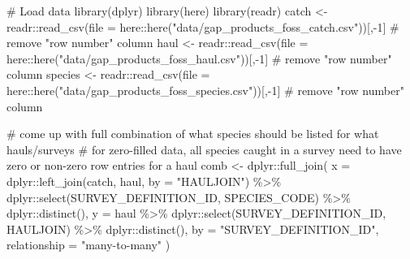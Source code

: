 \documentclass[
  letterpaper,
  oneside,
  open=any]{scrbook}
\newenvironment{Shaded}{\begin{snugshade}}{\end{snugshade}}
\newcommand{\AttributeTok}[1]{\textcolor[rgb]{0.40,0.45,0.13}{#1}}
\newcommand{\CommentTok}[1]{\textcolor[rgb]{0.37,0.37,0.37}{#1}}
\newcommand{\DecValTok}[1]{\textcolor[rgb]{0.68,0.00,0.00}{#1}}
\newcommand{\FunctionTok}[1]{\textcolor[rgb]{0.28,0.35,0.67}{#1}}
\newcommand{\NormalTok}[1]{\textcolor[rgb]{0.00,0.23,0.31}{#1}}
\newcommand{\OtherTok}[1]{\textcolor[rgb]{0.00,0.23,0.31}{#1}}
\newcommand{\SpecialCharTok}[1]{\textcolor[rgb]{0.37,0.37,0.37}{#1}}
\newcommand{\StringTok}[1]{\textcolor[rgb]{0.13,0.47,0.30}{#1}}
\begin{document}
\begin{Shaded}
\begin{Highlighting}[]
\CommentTok{\# Load data}
\FunctionTok{library}\NormalTok{(dplyr)}
\FunctionTok{library}\NormalTok{(here)}
\FunctionTok{library}\NormalTok{(readr)}
\NormalTok{catch }\OtherTok{\textless{}{-}}\NormalTok{ readr}\SpecialCharTok{::}\FunctionTok{read\_csv}\NormalTok{(}\AttributeTok{file =}\NormalTok{ here}\SpecialCharTok{::}\FunctionTok{here}\NormalTok{(}\StringTok{"data/gap\_products\_foss\_catch.csv"}\NormalTok{))[,}\SpecialCharTok{{-}}\DecValTok{1}\NormalTok{] }\CommentTok{\# remove "row number" column}
\NormalTok{haul }\OtherTok{\textless{}{-}}\NormalTok{ readr}\SpecialCharTok{::}\FunctionTok{read\_csv}\NormalTok{(}\AttributeTok{file =}\NormalTok{ here}\SpecialCharTok{::}\FunctionTok{here}\NormalTok{(}\StringTok{"data/gap\_products\_foss\_haul.csv"}\NormalTok{))[,}\SpecialCharTok{{-}}\DecValTok{1}\NormalTok{] }\CommentTok{\# remove "row number" column}
\NormalTok{species }\OtherTok{\textless{}{-}}\NormalTok{ readr}\SpecialCharTok{::}\FunctionTok{read\_csv}\NormalTok{(}\AttributeTok{file =}\NormalTok{ here}\SpecialCharTok{::}\FunctionTok{here}\NormalTok{(}\StringTok{"data/gap\_products\_foss\_species.csv"}\NormalTok{))[,}\SpecialCharTok{{-}}\DecValTok{1}\NormalTok{] }\CommentTok{\# remove "row number" column}

\CommentTok{\# come up with full combination of what species should be listed for what hauls/surveys}
\CommentTok{\# for zero{-}filled data, all species caught in a survey need to have zero or non{-}zero row entries for a haul}
\NormalTok{comb }\OtherTok{\textless{}{-}}\NormalTok{ dplyr}\SpecialCharTok{::}\FunctionTok{full\_join}\NormalTok{(}
  \AttributeTok{x =}\NormalTok{ dplyr}\SpecialCharTok{::}\FunctionTok{left\_join}\NormalTok{(catch, haul, }\AttributeTok{by =} \StringTok{"HAULJOIN"}\NormalTok{) }\SpecialCharTok{\%\textgreater{}\%}
\NormalTok{    dplyr}\SpecialCharTok{::}\FunctionTok{select}\NormalTok{(SURVEY\_DEFINITION\_ID, SPECIES\_CODE) }\SpecialCharTok{\%\textgreater{}\%}
\NormalTok{    dplyr}\SpecialCharTok{::}\FunctionTok{distinct}\NormalTok{(),}
  \AttributeTok{y =}\NormalTok{ haul }\SpecialCharTok{\%\textgreater{}\%}
\NormalTok{    dplyr}\SpecialCharTok{::}\FunctionTok{select}\NormalTok{(SURVEY\_DEFINITION\_ID, HAULJOIN) }\SpecialCharTok{\%\textgreater{}\%}
\NormalTok{    dplyr}\SpecialCharTok{::}\FunctionTok{distinct}\NormalTok{(), }
  \AttributeTok{by =} \StringTok{"SURVEY\_DEFINITION\_ID"}\NormalTok{, }
  \AttributeTok{relationship =} \StringTok{"many{-}to{-}many"}
\NormalTok{)}


\end{Highlighting}
\end{Shaded}
\end{document}
